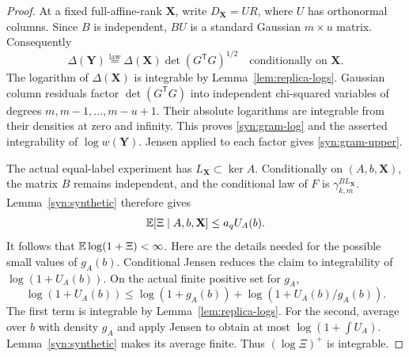 \begin{proof}
At a fixed full-affine-rank \(\mathbf X\), write
\(D_{\mathbf X}=UR\), where \(U\) has orthonormal columns.  Since \(B\)
is independent, \(BU\) is a standard Gaussian \(m\times u\) matrix.
Consequently
\[
 \Delta(\mathbf Y)\stackrel{\mathrm{law}}{=}
 \Delta(\mathbf X)\det(G^{\mathsf T}G)^{1/2}
 \quad\text{conditionally on }\mathbf X.
\]
The logarithm of \(\Delta(\mathbf X)\) is integrable by
Lemma~\ref{lem:replica-logs}.  Gaussian column residuals factor
\(\det(G^{\mathsf T}G)\) into independent chi-squared variables of degrees
\(m,m-1,\ldots,m-u+1\).  Their absolute logarithms are integrable from
their densities at zero and infinity.  This proves
\eqref{syn:gram-log} and the asserted integrability of \(\log w(\mathbf Y)\).
Jensen applied to each factor gives \eqref{syn:gram-upper}.

The actual equal-label experiment has \(L_{\mathbf X}\subset\ker A\).
Conditionally on \((A,b,\mathbf X)\), the matrix \(B\) remains independent,
and the conditional law of \(F\) is
\(\gamma_{k,m}^{B L_{\mathbf X}}\).  Lemma~\ref{syn:synthetic} therefore
gives
\begin{equation}\label{syn:conditional-mean}
 \mathbb E[\Xi\mid A,b,\mathbf X]\le a_qU_A(b).
\end{equation}
It follows that \(\mathbb E\log(1+\Xi)<\infty\).  Here are the details needed for
the possible small values of \(g_A(b)\).  Conditional Jensen reduces the
claim to integrability of \(\log(1+U_A(b))\).  On the actual finite positive
set for \(g_A\),
\[
 \log(1+U_A(b))
 \le\log(1+g_A(b))+\log(1+U_A(b)/g_A(b)).
\]
The first term is integrable by Lemma~\ref{lem:replica-logs}.  For the second,
average over \(b\) with density \(g_A\) and apply Jensen to obtain at most
\(\log(1+\int U_A)\).  Lemma~\ref{syn:synthetic} makes its average finite.
Thus \((\log\Xi)^+\) is integrable.


\end{proof}
